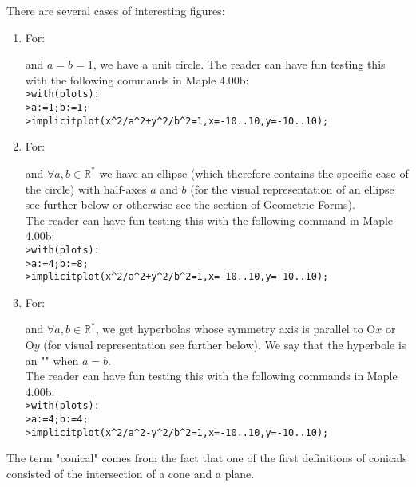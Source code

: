 \begin{enumerate}
\begin{itemize}
			There are several cases of interesting figures:			
			\begin{enumerate}
				\item For\label{equation of a circle}:
					
				and $a=b=1$, we have a unit circle. The reader can have fun testing this with the following commands in Maple 4.00b:\\
				
				\texttt{>with(plots):}\\
				\texttt{>a:=1;b:=1;}\\
				\texttt{>implicitplot(x\string^2/a\string^2+y\string^2/b\string^2=1,x=-10..10,y=-10..10);}
				
				\item For:
					
				and $\forall a,b \in \mathbb{R}^{*}$ we have an ellipse\label{analytical expression ellipse} (which therefore contains the specific case of the circle) with half-axes $a$ and $b$ (for the visual representation of an ellipse see further below or otherwise see the section of Geometric Forms).\\
				
				The reader can have fun testing this with the following command in Maple 4.00b:\\
				
				\texttt{>with(plots):}\\
				\texttt{>a:=4;b:=8;}\\
				\texttt{>implicitplot(x\string^2/a\string^2+y\string^2/b\string^2=1,x=-10..10,y=-10..10);}
				
				\item For:
				
				and $\forall a,b \in \mathbb{R}^{*}$, we get hyperbolas whose symmetry axis is parallel to $\text{O}x$ or $\text{O}y$ (for visual representation see further below). We say that the hyperbole is an "\label{hyperbola}" when $a = b$.\\
				
				The reader can have fun testing this with the following commands in Maple 4.00b:\\
				
				\texttt{>with(plots):}\\
				\texttt{>a:=4;b:=4;}\\
				\texttt{>implicitplot(x\string^2/a\string^2-y\string^2/b\string^2=1,x=-10..10,y=-10..10);}	
			\end{enumerate}
		\end{itemize}
		The term "conical" comes from the fact that one of the first definitions of conicals consisted of the intersection of a cone and a plane.
		

\end{enumerate}
